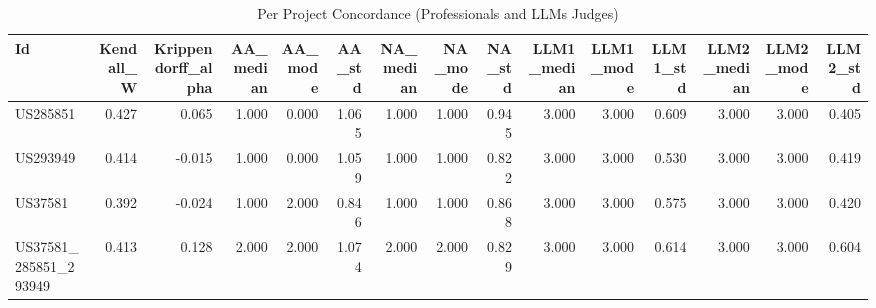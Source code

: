 \begin{table}
\caption{Per Project Concordance (Professionals and LLMs Judges)}
\label{tab:per_project_concordance_ALL_judges}
\begin{tabular}{lrrrrrrrrrrrrrr}
\toprule
Id & Kendall_W & Krippendorff_alpha & AA_median & AA_mode & AA_std & NA_median & NA_mode & NA_std & LLM1_median & LLM1_mode & LLM1_std & LLM2_median & LLM2_mode & LLM2_std \\
\midrule
US285851 & 0.427 & 0.065 & 1.000 & 0.000 & 1.065 & 1.000 & 1.000 & 0.945 & 3.000 & 3.000 & 0.609 & 3.000 & 3.000 & 0.405 \\
US293949 & 0.414 & -0.015 & 1.000 & 0.000 & 1.059 & 1.000 & 1.000 & 0.822 & 3.000 & 3.000 & 0.530 & 3.000 & 3.000 & 0.419 \\
US37581 & 0.392 & -0.024 & 1.000 & 2.000 & 0.846 & 1.000 & 1.000 & 0.868 & 3.000 & 3.000 & 0.575 & 3.000 & 3.000 & 0.420 \\
US37581_285851_293949 & 0.413 & 0.128 & 2.000 & 2.000 & 1.074 & 2.000 & 2.000 & 0.829 & 3.000 & 3.000 & 0.614 & 3.000 & 3.000 & 0.604 \\
\bottomrule
\end{tabular}
\end{table}
